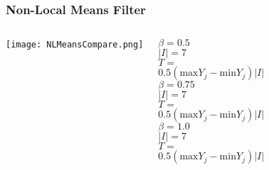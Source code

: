 \documentclass{beamer}
\begin{document}
\begin{frame}
\begin{center}
\frametitle{Non-Local Means Filter}

\begin{columns}


\texttt{[image: NLMeansCompare.png]}


\justifying

\tiny{

$\beta = 0.5$\\

$\lvert I \rvert = 7$\\

$T =$ \\ $0.5 \left( \mathrm{max} Y_j - \mathrm{min} Y_j \right) \lvert I \rvert$\\

$ $\\

$ $\\

$ $\\

$ $\\

$ $\\

$\beta = 0.75$\\

$\lvert I \rvert = 7$\\

$T =$ \\ $0.5 \left( \mathrm{max} Y_j - \mathrm{min} Y_j \right) \lvert I \rvert$\\

$ $\\

$ $\\

$ $\\

$ $\\

$ $\\

$\beta = 1.0$\\

$\lvert I \rvert = 7$\\

$T =$ \\ $0.5 \left( \mathrm{max} Y_j - \mathrm{min} Y_j \right) \lvert I \rvert$

}

\end{columns}

\end{center}
\end{frame}
\end{document}
